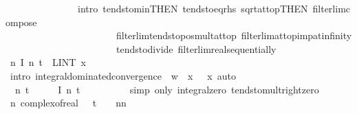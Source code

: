 {\ \ \ \ \ \ \ \ \ \ \ \ \ \ \ intro{\isacharbang}{\isacharcolon}\ tendsto{\isacharunderscore}min{\isacharbrackleft}THEN\ tendsto{\isacharunderscore}eq{\isacharunderscore}rhs{\isacharbrackright}\ sqrt{\isacharunderscore}at{\isacharunderscore}top{\isacharbrackleft}THEN\ filterlim{\isacharunderscore}compose{\isacharbrackright}\isanewline
\ \ \ \ \ \ \ \ \ \ \ \ \ \ \ \ \ \ \ \ \ \ \ filterlim{\isacharunderscore}tendsto{\isacharunderscore}pos{\isacharunderscore}mult{\isacharunderscore}at{\isacharunderscore}top\ filterlim{\isacharunderscore}at{\isacharunderscore}top{\isacharunderscore}imp{\isacharunderscore}at{\isacharunderscore}infinity\isanewline
\ \ \ \ \ \ \ \ \ \ \ \ \ \ \ \ \ \ \ \ \ \ \ tendsto{\isacharunderscore}divide{\isacharunderscore}{}\ filterlim{\isacharunderscore}real{\isacharunderscore}sequentially{\isacharparenright}\isanewline
\ \ \ \ \isamarkupfalse%
\ \isamarkupfalse%
\ {\isachardoublequoteopen}{\isacharparenleft}{\isasymlambda}n{\isachardot}\ {\isacharquery}I\ n\ t{\isacharparenright}\ {\isasymlonglonglongrightarrow}\ {\isacharparenleft}LINT\ x{\isacharbar}{\isasymmu}{\isachardot}\ {}{\isacharparenright}{\isachardoublequoteclose}\isanewline
\ \ \ \ \ \ \isamarkupfalse%
\ {\isacharparenleft}intro\ integral{\isacharunderscore}dominated{\isacharunderscore}convergence\ {\isacharbrackleft}\ w\ {\isacharequal}\ {\isachardoublequoteopen}{\isasymlambda}x{\isachardot}\ {}\ {\isacharasterisk}\ x{\isacharcircum}{}{\isachardoublequoteclose}{\isacharbrackright}{\isacharparenright}\ auto\isanewline
\ \ \ \ \isamarkupfalse%
\ \isamarkupfalse%
\ {\isacharasterisk}{\isacharcolon}\ {\isachardoublequoteopen}{\isacharparenleft}{\isasymlambda}n{\isachardot}\ t\ {\isacharslash}\ {\isacharparenleft}{}\ {\isacharasterisk}\ {\isasymsigma}\ {\isacharasterisk}\ {\isacharquery}I\ n\ t{\isacharparenright}\ {\isasymlonglonglongrightarrow}\ {}{\isachardoublequoteclose}\isanewline
\ \ \ \ \ \ \isamarkupfalse%
\ {\isacharparenleft}simp\ only{\isacharcolon}\ integral{\isacharunderscore}zero\ tendsto{\isacharunderscore}mult{\isacharunderscore}right{\isacharunderscore}zero{\isacharparenright}\isanewline
\isanewline
\ \ \ \ \isamarkupfalse%
\ {\isachardoublequoteopen}{\isacharparenleft}{\isasymlambda}n{\isachardot}\ complex{\isacharunderscore}of{\isacharunderscore}real\ {\isacharparenleft}{\isacharparenleft}{}\ {\isacharplus}\ {\isacharparenleft}{\isacharminus}{\isacharparenleft}t{\isacharcircum}{}{\isacharparenright}\ {\isacharslash}\ {}{\isacharparenright}\ {\isacharslash}\ n{\isacharparenright}{\isacharcircum}n{\isacharparenright}{\isacharparenright}\ {\isasymlonglonglongrightarrow}\isanewline
}
